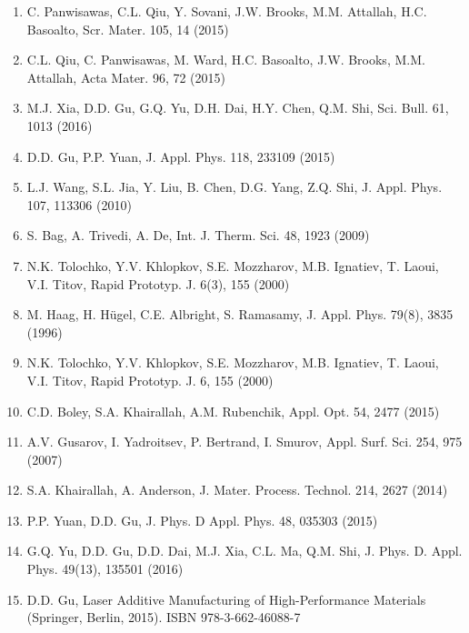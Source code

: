 \documentclass[10pt]{article}
\begin{document}
\begin{enumerate}
  \item C. Panwisawas, C.L. Qiu, Y. Sovani, J.W. Brooks, M.M. Attallah, H.C. Basoalto, Scr. Mater. 105, 14 (2015)

  \item C.L. Qiu, C. Panwisawas, M. Ward, H.C. Basoalto, J.W. Brooks, M.M. Attallah, Acta Mater. 96, 72 (2015)

  \item M.J. Xia, D.D. Gu, G.Q. Yu, D.H. Dai, H.Y. Chen, Q.M. Shi, Sci. Bull. 61, 1013 (2016)

  \item D.D. Gu, P.P. Yuan, J. Appl. Phys. 118, 233109 (2015)

  \item L.J. Wang, S.L. Jia, Y. Liu, B. Chen, D.G. Yang, Z.Q. Shi, J. Appl. Phys. 107, 113306 (2010)

  \item S. Bag, A. Trivedi, A. De, Int. J. Therm. Sci. 48, 1923 (2009)

  \item N.K. Tolochko, Y.V. Khlopkov, S.E. Mozzharov, M.B. Ignatiev, T. Laoui, V.I. Titov, Rapid Prototyp. J. 6(3), 155 (2000)

  \item M. Haag, H. Hügel, C.E. Albright, S. Ramasamy, J. Appl. Phys. 79(8), 3835 (1996)

  \item N.K. Tolochko, Y.V. Khlopkov, S.E. Mozzharov, M.B. Ignatiev, T. Laoui, V.I. Titov, Rapid Prototyp. J. 6, 155 (2000)

  \item C.D. Boley, S.A. Khairallah, A.M. Rubenchik, Appl. Opt. 54, 2477 (2015)

  \item A.V. Gusarov, I. Yadroitsev, P. Bertrand, I. Smurov, Appl. Surf. Sci. 254, 975 (2007)

  \item S.A. Khairallah, A. Anderson, J. Mater. Process. Technol. 214, 2627 (2014)

  \item P.P. Yuan, D.D. Gu, J. Phys. D Appl. Phys. 48, 035303 (2015)

  \item G.Q. Yu, D.D. Gu, D.D. Dai, M.J. Xia, C.L. Ma, Q.M. Shi, J. Phys. D. Appl. Phys. 49(13), 135501 (2016)

  \item D.D. Gu, Laser Additive Manufacturing of High-Performance Materials (Springer, Berlin, 2015). ISBN 978-3-662-46088-7


\end{enumerate}
\end{document}
